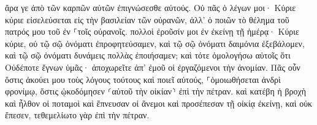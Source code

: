 \documentclass{openreader}
\begin{document}
ἄρα γε ἀπὸ τῶν καρπῶν αὐτῶν ἐπιγνώσεσθε αὐτούς. 
Οὐ πᾶς ὁ λέγων μοι· Κύριε κύριε εἰσελεύσεται εἰς τὴν βασιλείαν τῶν οὐρανῶν, ἀλλ’ ὁ ποιῶν τὸ θέλημα τοῦ πατρός μου τοῦ ἐν ⸀τοῖς οὐρανοῖς. 
πολλοὶ ἐροῦσίν μοι ἐν ἐκείνῃ τῇ ἡμέρᾳ· Κύριε κύριε, οὐ τῷ σῷ ὀνόματι ἐπροφητεύσαμεν, καὶ τῷ σῷ ὀνόματι δαιμόνια ἐξεβάλομεν, καὶ τῷ σῷ ὀνόματι δυνάμεις πολλὰς ἐποιήσαμεν; 
καὶ τότε ὁμολογήσω αὐτοῖς ὅτι Οὐδέποτε ἔγνων ὑμᾶς· ἀποχωρεῖτε ἀπ’ ἐμοῦ οἱ ἐργαζόμενοι τὴν ἀνομίαν. 
Πᾶς οὖν ὅστις ἀκούει μου τοὺς λόγους τούτους καὶ ποιεῖ αὐτούς, ⸀ὁμοιωθήσεται ἀνδρὶ φρονίμῳ, ὅστις ᾠκοδόμησεν ⸂αὐτοῦ τὴν οἰκίαν⸃ ἐπὶ τὴν πέτραν. 
καὶ κατέβη ἡ βροχὴ καὶ ἦλθον οἱ ποταμοὶ καὶ ἔπνευσαν οἱ ἄνεμοι καὶ προσέπεσαν τῇ οἰκίᾳ ἐκείνῃ, καὶ οὐκ ἔπεσεν, τεθεμελίωτο γὰρ ἐπὶ τὴν πέτραν. 
\end{document}
